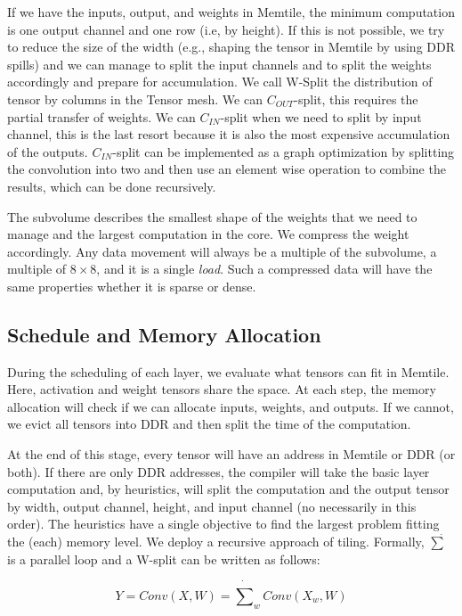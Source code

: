 \documentclass[conference]{IEEEtran}
\begin{document}
If we have the inputs, output, and weights in Memtile, 
the minimum computation is
one output channel and one row (i.e, by height). If this is not
possible, we try to reduce the size of the width (e.g., shaping the
tensor in Memtile by using DDR spills) and we can manage to split the
input channels and to split the weights accordingly and prepare for
accumulation. We call W-Split the distribution of tensor by columns
in the Tensor mesh. We can $C_{OUT}$-split, this requires the partial transfer
of weights.  We can $C_{IN}$-split when we need to split by input channel,
this is the last resort because it is also the most expensive
accumulation of the outputs. $C_{IN}$-split can be implemented as a graph
optimization by splitting the convolution into two and then use an
element wise operation to combine the results, which can be done
recursively.

The subvolume describes the smallest shape of the weights that we need
to manage and the largest computation in the core. We compress the
weight accordingly. Any data movement will always be a multiple of the
subvolume, a multiple of $8\times 8$,  and it is a single {\em load}. 
Such a compressed data will have the
same properties whether it is sparse or dense. 


\subsection{Schedule and Memory Allocation}
\label{sec:memory}
During the scheduling of each layer, we evaluate what tensors can fit
in Memtile. Here, activation and weight tensors share the space.  At
each step, the memory allocation will check if we can allocate
inputs, weights, and outputs. If we cannot, we evict all tensors
into DDR and then split the time of the computation.

At the end of this stage, every tensor will have an address in Memtile
or DDR (or both). If there are only DDR addresses, the compiler will
take the basic layer computation and, by heuristics, will split the
computation and the output tensor by width, output channel, height,
and input channel (no necessarily in this order). The heuristics have
a single objective to find the largest problem fitting the (each)
memory level. We deploy a recursive approach of tiling.  Formally,
$\dot{\sum}$ is a parallel loop and a W-split can be written as
follows:

\begin{equation}
  Y =  Conv(X,W) = \dot{\sum}_w
  Conv(X_{w},W)
\end{equation}
\end{document}
